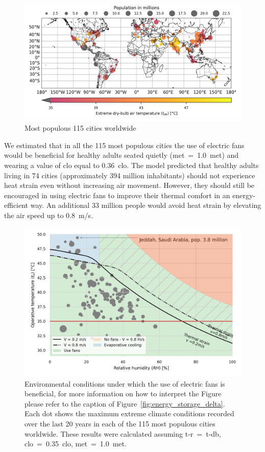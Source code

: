 \begin{figure}[thb!]
    \centering
    \includegraphics[width=\textwidth]{figures/map-population-temperature}
    \caption{Most populous 115 cities worldwide}
    \label{fig:map-population-temperature}
\end{figure}

We estimated that in all the 115 most populous cities the use of electric fans would be beneficial for healthy adults seated quietly (\ac{met}~=~1.0~met) and wearing a value of \ac{clo} equal to 0.36~clo.
The  model predicted that healthy adults living in 74 cities (approximately 394 million inhabitants) should not experience heat strain even without increasing air movement.
However, they should still be encouraged in using electric fans to improve their thermal comfort in an energy-efficient way.
An additional 33 million people would avoid heat strain by elevating the air speed up to 0.8~m/s.

\begin{figure}[thb!]
    \centering
    \includegraphics[width=\textwidth]{figures/use_fans_and_population}
    \caption{Environmental conditions under which the use of electric fans is beneficial, for more information on how to interpret the Figure please refer to the caption of Figure~\ref{fig:energy_storage_delta}.
    Each dot shows the maximum extreme climate conditions recorded over the last 20 years in each of the 115 most populous cities worldwide.
    These results were calculated assuming \ac{t-r}~=~\ac{t-db}, \ac{clo}~=~0.35~clo, \ac{met}~=~1.0~met.}
    \label{fig:use_fans_and_population}
\end{figure}

